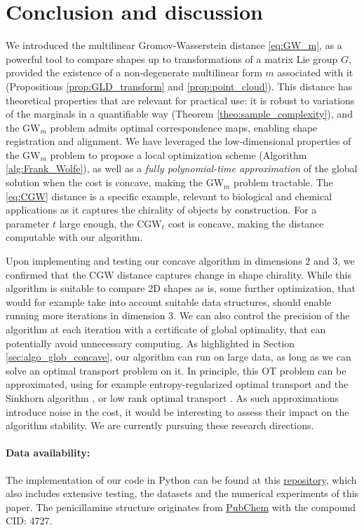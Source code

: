 \documentclass{article}
\newcommand{\1}{\mathbf{1}}
\newcommand{\CGW}{\mathrm{CGW}}
\newcommand{\GW}{\mathrm{GW}}
\theoremstyle{definition}
\theoremstyle{remark}
\begin{document}
\section{Conclusion and discussion}
We introduced the multilinear Gromov-Wasserstein distance \ref{eq:GW_m}, as a powerful tool to compare shapes up to transformations of a matrix Lie group $G$, provided the existence of a non-degenerate multilinear form $m$ associated with it (Propositions \ref{prop:GLD_transform} and \ref{prop:point_cloud}). This distance has theoretical properties that are relevant for practical use: it is robust to variations of the marginals in a quantifiable way (Theorem \ref{theo:sample_complexity}), and the $\GW_m$ problem admits optimal correspondence maps, enabling shape registration and alignment. We have leveraged the low-dimensional properties of the $\GW_m$ problem to propose a local optimization scheme (Algorithm \ref{alg:Frank_Wolfe}), as well as a \emph{fully polynomial-time approximation} of the global solution when the cost is concave, making the $\GW_m$ problem tractable. The \ref{eq:CGW} distance is a specific example, relevant to biological and chemical applications as it captures the chirality of objects by construction. For a parameter $t $ large enough, the $\CGW_t$ cost is concave, making the distance computable with our algorithm. 

Upon implementing and testing our concave algorithm in dimensions 2 and 3, we confirmed that the $\CGW$ distance captures change in shape chirality. While this algorithm is suitable to compare 2D shapes as is, some further optimization, that would for example take into account suitable data structures, should enable running more iterations in dimension 3. We can also control the precision of the algorithm at each iteration with a certificate of global optimality, that can potentially avoid unnecessary computing. As highlighted in Section \ref{sec:algo_glob_concave}, our algorithm can run on large data, as long as we can solve an optimal transport problem on it. In principle, this OT problem can be approximated, using for example entropy-regularized optimal transport and the  Sinkhorn algorithm \cite{cuturi2013sinkhorn}, or low rank optimal transport \cite{scetbon2022low}. As such approximations introduce noise in the cost, it would be interesting to assess their impact on the algorithm stability. We are currently pursuing these research directions.




\paragraph{Data availability:}The implementation of our code in Python can be found at this \href{https://github.com/geoffwoollard/xgw}{repository}, which also includes extensive testing, the datasets and the numerical experiments of this paper. The penicillamine structure originates from \href{https://pubchem.ncbi.nlm.nih.gov/}{PubChem} \cite{Kim2025_pubchem} with the compound CID: 4727.
\end{document}
